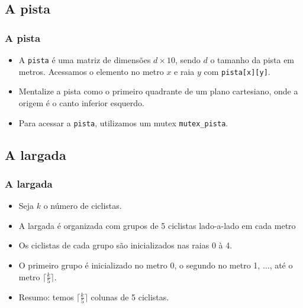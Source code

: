 \documentclass{beamer}
\begin{document}
\subsection{A pista}
\begin{frame}
  \frametitle{A pista}
  \begin{itemize}
    \item A \texttt{pista} é uma matriz de dimensões $d \times 10$, sendo $d$ o tamanho da pista em metros. Acessamos o elemento no metro $x$ e raia $y$ com \texttt{pista[x][y]}.
    \item Mentalize a pista como o primeiro quadrante de um plano cartesiano, onde a origem é o canto inferior esquerdo.
    \item Para acessar a \texttt{pista}, utilizamos um mutex \texttt{mutex\_pista}.
  \end{itemize}
\end{frame}

\subsection{A largada}
\begin{frame}
  \frametitle{A largada}
  \begin{itemize}
    \item Seja $k$ o número de ciclistas.
    \item A largada é organizada com grupos de 5 ciclistas lado-a-lado em cada metro
    \item Os ciclistas de cada grupo são inicializados nas raias 0 à 4.
    \item O primeiro grupo é inicializado no metro 0, o segundo no metro 1, $\dots$, até o metro $\lceil\frac{k}{5}\rceil$.
    \item Resumo: temos $\lceil\frac{k}{5}\rceil$ colunas de 5 ciclistas.
  \end{itemize}
\end{frame}
\end{document}
